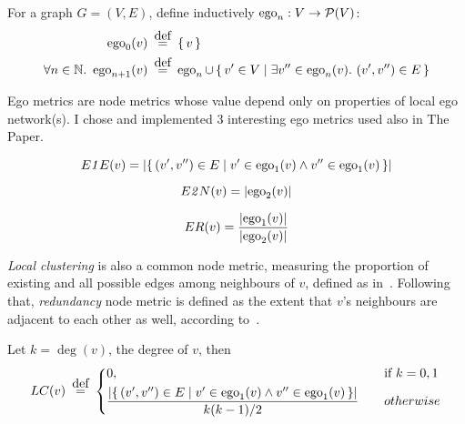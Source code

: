 \begin{definition}
    For a graph $G = (V, E)$, define inductively $\operatorname{ego}_n : V \rightarrow \mathcal{P}(V)$:
    \begin{align*}
        \ego_0(v) &\eqdef \left\{\, v \, \right\} \\
        \forall n \in \mathbb{N}.\ \ego_{n+1} (v) &\eqdef \ego_n \cup \Set{v' \in V}{ \exists v'' \in \ego_n(v).\ (v', v'') \in E }
    \end{align*}
\end{definition}



Ego metrics are node metrics whose value depend only on properties of local ego network(s).
I chose and implemented 3 interesting ego metrics used also in The Paper.

\begin{definition}
    \[ E\mathit{1}E (v) = \left\lvert \left\{\, (v', v'') \in E \mid  v' \in \operatorname{ego}_1(v) \wedge v'' \in \operatorname{ego}_1(v)  \, \right\} \right\rvert \]
\end{definition}

\begin{definition}
    \[ E\mathit{2}N (v) = \left\lvert \operatorname{ego}_2(v) \right\rvert \]
\end{definition}

\begin{definition}
    \[ ER(v) = \frac{ \left\lvert \operatorname{ego}_1(v) \right\rvert }{ \left\lvert \operatorname{ego}_2(v) \right\rvert } \]
\end{definition}

\textsl{Local clustering} is also a common node metric, measuring the proportion of existing and all possible edges among neighbours of $v$, defined as in~\cite{WattsCollectiveDynamicsSmallworld1998}.
Following that, \textsl{redundancy} node metric is defined as the extent that $v$'s neighbours are adjacent to each other as well, according to~\cite{borgatti1997structural}.
\begin{definition}
    Let $k = \deg(v)$, the degree of $v$, then
    \[
        LC(v) \eqdef
        \begin{dcases}
            0, &\text{if } k = 0,1 \\
            \frac{ \left\lvert \Set{ (v', v'') \in E }{ v' \in \ego_1(v) \wedge v'' \in \ego_1(v) } \right\rvert }{ k (k-1) / 2 } \quad &otherwise
        \end{dcases}
    \]

\end{definition}

